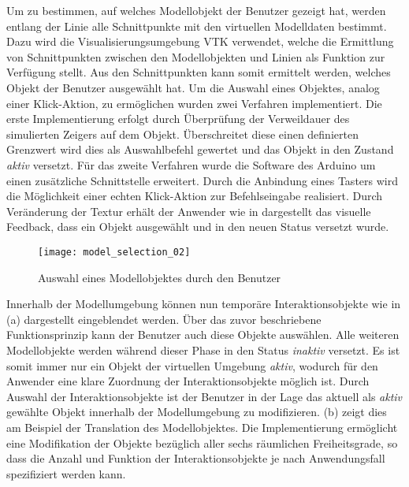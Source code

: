 Um zu bestimmen, auf welches Modellobjekt der Benutzer gezeigt hat, werden entlang der Linie alle Schnittpunkte mit den virtuellen Modelldaten bestimmt. Dazu wird die Visualisierungsumgebung VTK verwendet, welche die Ermittlung von Schnittpunkten zwischen den Modellobjekten und Linien als Funktion zur Verfügung stellt. Aus den Schnittpunkten kann somit ermittelt werden, welches Objekt der Benutzer ausgewählt hat. Um die Auswahl eines Objektes, analog einer \glqq Klick\grqq -Aktion, zu ermöglichen wurden zwei Verfahren implementiert. Die erste Implementierung erfolgt durch Überprüfung der Verweildauer des simulierten Zeigers auf dem Objekt. Überschreitet diese einen definierten Grenzwert wird dies als Auswahlbefehl gewertet und das Objekt in den Zustand \textit{aktiv} versetzt. Für das zweite Verfahren wurde die Software des Arduino um einen zusätzliche Schnittstelle erweitert. Durch die Anbindung eines Tasters wird die Möglichkeit einer echten \glqq Klick\grqq -Aktion zur Befehlseingabe realisiert. Durch Veränderung der Textur erhält der Anwender wie in  dargestellt das visuelle Feedback, dass ein Objekt ausgewählt und in den neuen Status versetzt wurde.\\

\begin{figure}[!ht]
	\begin{center}
	\texttt{[image: model\_selection\_02]}
	\caption{Auswahl eines Modellobjektes durch den Benutzer}
	\label{fig.intintersect}
	\end{center}
\end{figure}%
%
Innerhalb der Modellumgebung können nun temporäre Interaktionsobjekte wie in  (a) dargestellt eingeblendet werden. Über das zuvor beschriebene Funktionsprinzip kann der Benutzer auch diese Objekte auswählen. Alle weiteren Modellobjekte werden während dieser Phase in den Status \textit{inaktiv} versetzt. Es ist somit immer nur ein Objekt der virtuellen Umgebung \textit{aktiv}, wodurch für den Anwender eine klare Zuordnung der Interaktionsobjekte möglich ist. Durch Auswahl der Interaktionsobjekte ist der Benutzer in der Lage das aktuell als \textit{aktiv} gewählte Objekt innerhalb der Modellumgebung zu modifizieren.  (b) zeigt dies am Beispiel der Translation des Modellobjektes. Die Implementierung ermöglicht eine Modifikation der Objekte bezüglich aller sechs räumlichen Freiheitsgrade, so dass die Anzahl und Funktion der Interaktionsobjekte je nach Anwendungsfall spezifiziert werden kann.\\

